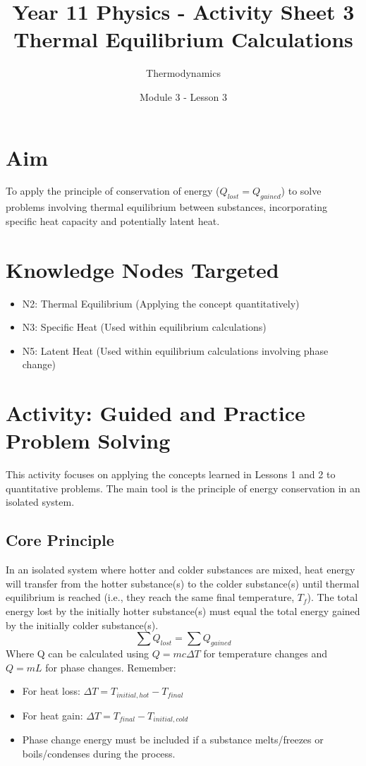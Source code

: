 \documentclass[11pt, a4paper]{article} %
\title{Year 11 Physics - Activity Sheet 3 \\ Thermal Equilibrium Calculations}
\date{Module 3 - Lesson 3}
\author{Thermodynamics}
\begin{document}
\maketitle

\section*{Aim}
To apply the principle of conservation of energy ($Q_{lost} = Q_{gained}$) to solve problems involving thermal equilibrium between substances, incorporating specific heat capacity and potentially latent heat.

\section*{Knowledge Nodes Targeted}
\begin{itemize}
    \item N2: Thermal Equilibrium (Applying the concept quantitatively)
    \item N3: Specific Heat (Used within equilibrium calculations)
    \item N5: Latent Heat (Used within equilibrium calculations involving phase change)
\end{itemize}

\section*{Activity: Guided and Practice Problem Solving}
This activity focuses on applying the concepts learned in Lessons 1 and 2 to quantitative problems. The main tool is the principle of energy conservation in an isolated system.

\subsection*{Core Principle}
In an isolated system where hotter and colder substances are mixed, heat energy will transfer from the hotter substance(s) to the colder substance(s) until thermal equilibrium is reached (i.e., they reach the same final temperature, $T_f$). The total energy lost by the initially hotter substance(s) must equal the total energy gained by the initially colder substance(s).
\[ \sum Q_{lost} = \sum Q_{gained} \]
Where Q can be calculated using $Q=mc\Delta T$ for temperature changes and $Q=mL$ for phase changes. Remember:
\begin{itemize}
    \item For heat loss: $\Delta T = T_{initial, hot} - T_{final}$
    \item For heat gain: $\Delta T = T_{final} - T_{initial, cold}$
    \item Phase change energy must be included if a substance melts/freezes or boils/condenses during the process.
\end{itemize}
\end{document}
